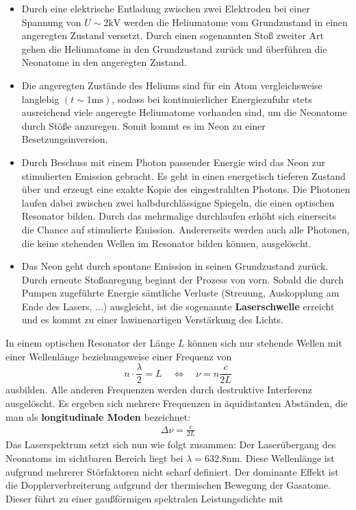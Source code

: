 \documentclass[german,  %
parskip=full,  %
]{scrartcl}
\begin{document}
\begin{itemize}
\item Durch eine elektrische Entladung zwischen zwei Elektroden bei einer Spannung von \(U\sim 2\mathrm{kV}\) werden die Heliumatome vom Grundzustand in einen angeregten Zustand versetzt. Durch einen sogenannten Stoß zweiter Art gehen die Heliumatome in den Grundzustand zurück und überführen die Neonatome in den angeregten Zustand.
\item Die angeregten Zustände des Heliums sind für ein Atom vergleichsweise langlebig \((t\sim 1\mathrm{ms})\), sodass bei kontinuierlicher Energiezufuhr stets ausreichend viele angeregte Heliumatome vorhanden sind, um die Neonatome durch Stöße anzuregen. Somit kommt es im Neon zu einer Besetzungsinversion.
\item Durch Beschuss mit einem Photon passender Energie wird das Neon zur stimulierten Emission gebracht. Es geht in einen energetisch tieferen Zustand über und erzeugt eine exakte Kopie des eingestrahlten Photons. Die Photonen laufen dabei zwischen zwei halbdurchlässigne Spiegeln, die einen optischen Resonator bilden. Durch das mehrmalige durchlaufen erhöht sich einerseits die Chance auf stimulierte Emission. Andererseits werden auch alle Photonen, die keine stehenden Wellen im Resonator bilden können, ausgelöscht.
\item Das Neon geht durch spontane Emission in seinen Grundzustand zurück. Durch erneute Stoßanregung beginnt der Prozess von vorn. Sobald die durch Pumpen zugeführte Energie sämtliche Verluste (Streuung, Auskopplung am Ende des Lasers, ...) ausgleicht, ist die sogenannte \textbf{Laserschwelle} erreicht und es kommt zu einer lawinenartigen Verstärkung des Lichts.
\end{itemize}
In einem optischen Resonator der Länge \(L\) können sich nur stehende Wellen mit einer Wellenlänge beziehungsweise einer Frequenz von
\[n\cdot\frac{\lambda}{2} = L  \quad\Longleftrightarrow\quad \nu = n\frac{c}{2L}\]
ausbilden. Alle anderen Frequenzen werden durch destruktive Interferenz ausgelöscht. Es ergeben sich mehrere Frequenzen in äquidistanten Abständen, die man als \textbf{longitudinale Moden} bezeichnet:
\begin{align}
\Delta\nu = \frac{c}{2L}
\end{align}
Das Laserspektrum setzt sich nun wie folgt zusammen: Der Laserübergang des Neonatoms im sichtbaren Bereich liegt bei \(\lambda = 632.8 \mathrm{nm}\). Diese Wellenlänge ist aufgrund mehrerer Störfaktoren nicht scharf definiert. Der dominante Effekt ist die Dopplerverbreiterung aufgrund der thermischen Bewegung der Gasatome. Dieser führt zu einer gaußförmigen spektralen Leistungsdichte mit
\end{document}
